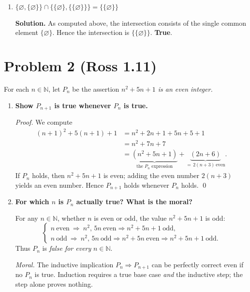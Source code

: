\documentclass[12pt]{article}
\begin{document}
\begin{enumerate}[label=\Alph*.]
   \textbf{Solution.} The first set has elements $\varnothing$ and $\{\varnothing\}$; the second has
   $\{\varnothing\}$ and $\{\{\varnothing\}\}$.  
   The only common element is $\{\varnothing\}$, so
   \[
   \{\varnothing,\{\varnothing\}\}\cap\{\{\varnothing\},\{\{\varnothing\}\}\}=\{\{\varnothing\}\}.
   \]
   This is not $\{\varnothing\}$. \textbf{False}.
   
   \vspace{0.2cm}
   
   \item $\{\varnothing,\{\varnothing\}\}\cap\{\{\varnothing\},\{\{\varnothing\}\}\}=\{\{\varnothing\}\}$
   
   \textbf{Solution.} As computed above, the intersection consists of the single common element
   $\{\varnothing\}$. Hence the intersection is $\{\{\varnothing\}\}$. \textbf{True}.
\end{enumerate}

\section*{Problem 2 (Ross 1.11)}
For each $n\in\mathbb N$, let $P_n$ be the assertion \emph{$n^2+5n+1$ is an even integer.}

\begin{enumerate}[label=(\alph*)]
\item \textbf{Show $P_{n+1}$ is true whenever $P_n$ is true.}

\textit{Proof.}
We compute
\begin{align*}
(n+1)^2+5(n+1)+1
&= n^2+2n+1+5n+5+1 \\
&= n^2+7n+7 \\
&= \underbrace{(n^2+5n+1)}_{\text{the $P_n$ expression}}
    + \underbrace{(2n+6)}_{=\,2(n+3)\ \text{even}}.
\end{align*}
If $P_n$ holds, then $n^2+5n+1$ is even; adding the even number $2(n+3)$ yields an even number.
Hence $P_{n+1}$ holds whenever $P_n$ holds. \qed

\item \textbf{For which $n$ is $P_n$ actually true? What is the moral?}

For any $n\in\mathbb N$, whether $n$ is even or odd, the value $n^2+5n+1$ is odd:
\[
\begin{cases}
n\ \text{even} \ \Rightarrow\ n^2,\,5n\ \text{even} \Rightarrow n^2+5n+1\ \text{odd},\\[2pt]
n\ \text{odd} \ \Rightarrow\ n^2,\,5n\ \text{odd} \Rightarrow n^2+5n\ \text{even} \Rightarrow n^2+5n+1\ \text{odd}.
\end{cases}
\]
Thus $P_n$ is \emph{false for every} $n\in\mathbb N$.

\medskip
\textit{Moral.} The inductive implication $P_n\Rightarrow P_{n+1}$ can be perfectly correct even if no $P_n$
is true. Induction requires a true base case \emph{and} the inductive step; the step alone proves nothing.
\end{enumerate}
\end{document}
